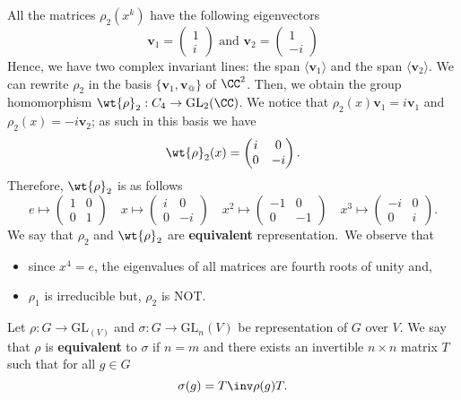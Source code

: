 \documentclass[12pt, a4paper]{article}
\newcommand{\gl}{\text{GL}}
\begin{document}
\begin{mdexample}
    All the matrices \(\rho_2(x^k)\) have the following eigenvectors 
    \[\bm{v}_1 =\begin{pmatrix} 1 \\i\end{pmatrix} \text{ and } \bm{v}_2 = \begin{pmatrix} 1 \\ -i\end{pmatrix}\]
    Hence, we have two complex invariant lines: the span \(\langle \bm{v}_1 \rangle\) and the span \(\langle \bm{v}_2 \rangle\). We can rewrite \(\rho_2\) in the basis \(\{\bm{v}_1,\bm{v}_@\}\) of \(\CC^2\). Then, we obtain the group homomorphism \(\wt{\rho}_2 : C_4 \to \gl_2(\CC)\). We notice that \(\rho_2(x)\bm{v}_1=i\bm{v}_1\) and \(\rho_2(x)=-i\bm{v}_2\); as such in this basis we have 
    \[\wt{\rho}_2(x) = \begin{pmatrix} i & 0 \\ 0 &-i\end{pmatrix}.\]
    Therefore, \(\wt{\rho}_2\) is as follows
    \[e \mapsto \begin{pmatrix} 1 & 0 \\ 0 &1\end{pmatrix}\quad x\mapsto \begin{pmatrix} i & 0 \\ 0 &-i\end{pmatrix}\quad x^2 \mapsto \begin{pmatrix} -1 & 0 \\ 0 &-1\end{pmatrix}\quad x^3 \mapsto\begin{pmatrix} -i & 0 \\ 0 &i\end{pmatrix}.\]
    We say that \(\rho_2\) and \(\wt{\rho}_2\) are \textbf{equivalent} representation.\ We observe that 
    \begin{itemize}
        \item since \(x^4=e\), the eigenvalues of all matrices are fourth roots of unity and,
        \item \(\rho_1\) is irreducible but, \(\rho_2\) is NOT.
    \end{itemize}
\end{mdexample}

\begin{definition}
    Let \(\rho:G \to \gl_(V)\) and \(\sigma:G\to \gl_n(V)\) be representation of \(G\) over \(V\). We say that \(\rho\) is \textbf{equivalent} to \(\sigma\) if \(n=m\) and there exists an invertible \(n \times n\) matrix \(T\) such that for all \(g \in G\)
    \[\sigma(g) = T\inv \rho(g) T.\]
\end{definition}
\end{document}
